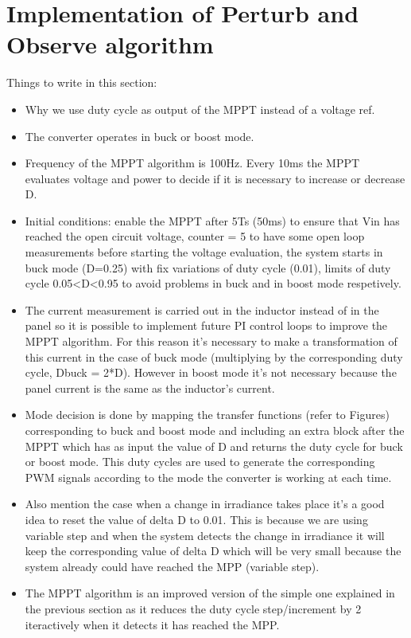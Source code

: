 \section{Implementation of Perturb and Observe algorithm}\label{MPPTImplementation}


Things to write in this section: 
\begin{itemize}
	\item Why we use duty cycle as output of the MPPT instead of a voltage ref. 
	\item The converter operates in buck or boost mode. 
	\item Frequency of the MPPT algorithm is 100Hz. Every 10ms the MPPT evaluates voltage and power to decide if it is necessary to increase or decrease D. 
	\item Initial conditions: enable the MPPT after 5Ts (50ms) to ensure that Vin has reached the open circuit voltage, counter = 5 to have some open loop measurements before starting the voltage evaluation, the system starts in buck mode (D=0.25) with fix variations of duty cycle (0.01), limits of duty cycle 0.05<D<0.95 to avoid problems in buck and in boost mode respetively. 
	\item The current measurement is carried out in the inductor instead of in the panel so it is possible to implement future PI control loops to improve the MPPT algorithm. For this reason it's necessary to make a transformation of this current in the case of buck mode (multiplying by the corresponding duty cycle, Dbuck = 2*D). However in boost mode it's not necessary because the panel current is the same as the inductor's current. 
	\item Mode decision is done by mapping the transfer functions (refer to Figures) corresponding to buck and boost mode and including an extra block after the MPPT which has as input the value of D and returns the duty cycle for buck or boost mode. This duty cycles are used to generate the corresponding PWM signals according to the mode the converter is working at each time. 
	\item Also mention the case when a change in irradiance takes place it's a good idea to reset the value of delta D to 0.01. This is because we are using variable step and when the system detects the change in irradiance it will keep the corresponding value of delta D which will be very small because the system already could have reached the MPP (variable step). 
	\item The MPPT algorithm is an improved version of the simple one explained in the previous section as it reduces the duty cycle step/increment by 2 iteractively when it detects it has reached the MPP.

\end{itemize}


